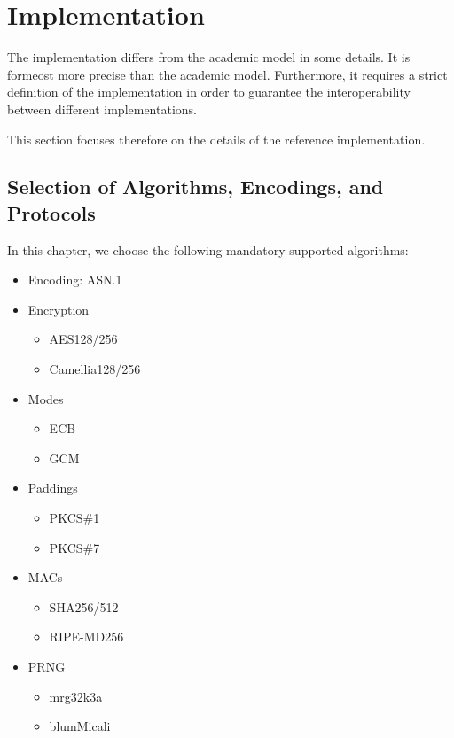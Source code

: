 
\part{Implementation}\label{sec:implementation}
The implementation differs from the academic model in some details. It is formeost more precise than the academic model. Furthermore, it requires a strict definition of the implementation in order to guarantee the interoperability between different implementations.

This section focuses therefore on the details of the reference implementation.

\chapter{Selection of Algorithms, Encodings, and Protocols}
In this chapter, we choose the following mandatory supported algorithms:
\begin{itemize}
	\item Encoding: ASN.1
	\item Encryption
	\begin{itemize}
		\item AES128/256
		\item Camellia128/256
	\end{itemize}
    \item Modes
    \begin{itemize}
    	\item ECB
    	\item GCM
    \end{itemize}
	\item Paddings
	\begin{itemize}
		\item PKCS\#1
		\item PKCS\#7
	\end{itemize}
	\item MACs
	\begin{itemize}
		\item SHA256/512
		\item RIPE-MD256
	\end{itemize}
	\item PRNG
	\begin{itemize}
		\item mrg32k3a
		\item blumMicali
	\end{itemize}
\end{itemize}


